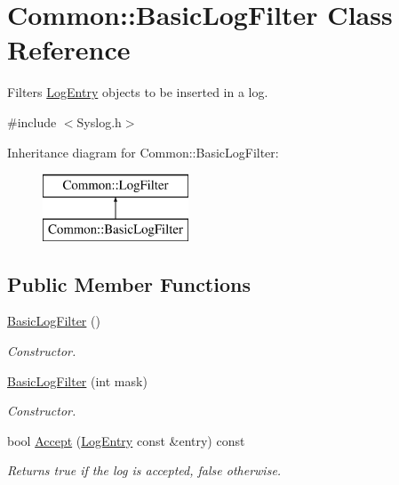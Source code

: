 \hypertarget{class_common_1_1_basic_log_filter}{\section{Common\-:\-:Basic\-Log\-Filter Class Reference}
\label{class_common_1_1_basic_log_filter}
}


Filters \hyperlink{class_common_1_1_log_entry}{Log\-Entry} objects to be inserted in a log.  




{\ttfamily \#include $<$Syslog.\-h$>$}

Inheritance diagram for Common\-:\-:Basic\-Log\-Filter\-:\begin{figure}[H]
\begin{center}
\leavevmode
\includegraphics[height=2.000000cm]{class_common_1_1_basic_log_filter}
\end{center}
\end{figure}
\subsection*{Public Member Functions}
\begin{DoxyCompactItemize}
\item 
\hypertarget{class_common_1_1_basic_log_filter_a3c4f7c45a78fe892154822d2d48bb179}{\hyperlink{class_common_1_1_basic_log_filter_a3c4f7c45a78fe892154822d2d48bb179}{Basic\-Log\-Filter} ()}\label{class_common_1_1_basic_log_filter_a3c4f7c45a78fe892154822d2d48bb179}

\begin{DoxyCompactList}\small\item\em Constructor. \end{DoxyCompactList}\item 
\hyperlink{class_common_1_1_basic_log_filter_a5cfd74a2b7b89eb164f75a9db91cb1c2}{Basic\-Log\-Filter} (int mask)
\begin{DoxyCompactList}\small\item\em Constructor. \end{DoxyCompactList}\item 
\hypertarget{class_common_1_1_basic_log_filter_a6dcb632906cd269b32a659633060b008}{bool \hyperlink{class_common_1_1_basic_log_filter_a6dcb632906cd269b32a659633060b008}{Accept} (\hyperlink{class_common_1_1_log_entry}{Log\-Entry} const \&entry) const }\label{class_common_1_1_basic_log_filter_a6dcb632906cd269b32a659633060b008}

\begin{DoxyCompactList}\small\item\em Returns true if the log is accepted, false otherwise. \end{DoxyCompactList}\end{DoxyCompactItemize}


